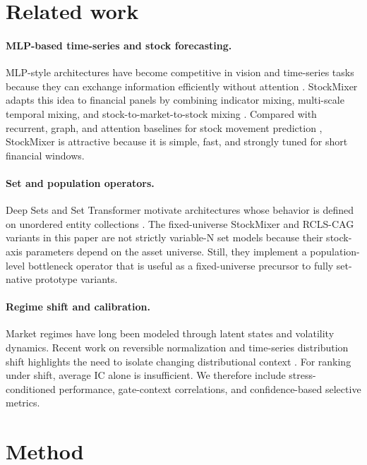 \documentclass{article}
\begin{document}
\section{Related work}

\paragraph{MLP-based time-series and stock forecasting.}
MLP-style architectures have become competitive in vision and time-series tasks because they can exchange information efficiently without attention \citep{mlpmixer,patchtst}. StockMixer adapts this idea to financial panels by combining indicator mixing, multi-scale temporal mixing, and stock-to-market-to-stock mixing \citep{stockmixer}. Compared with recurrent, graph, and attention baselines for stock movement prediction \citep{alstm,sthan,estimate}, StockMixer is attractive because it is simple, fast, and strongly tuned for short financial windows.

\paragraph{Set and population operators.}
Deep Sets and Set Transformer motivate architectures whose behavior is defined on unordered entity collections \citep{deepsets,settransformer}. The fixed-universe StockMixer and RCLS-CAG variants in this paper are not strictly variable-N set models because their stock-axis parameters depend on the asset universe. Still, they implement a population-level bottleneck operator that is useful as a fixed-universe precursor to fully set-native prototype variants.

\paragraph{Regime shift and calibration.}
Market regimes have long been modeled through latent states and volatility dynamics. Recent work on reversible normalization and time-series distribution shift highlights the need to isolate changing distributional context \citep{revin}. For ranking under shift, average IC alone is insufficient. We therefore include stress-conditioned performance, gate-context correlations, and confidence-based selective metrics.

\section{Method}
\end{document}
